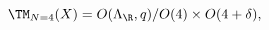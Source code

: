 \begin{equation}
\label{eq:TMNfour}
  \TM_{N=4}(X) = O(\Lambda_\R,q)/O(4) \times O(4+\delta),
\end{equation}

